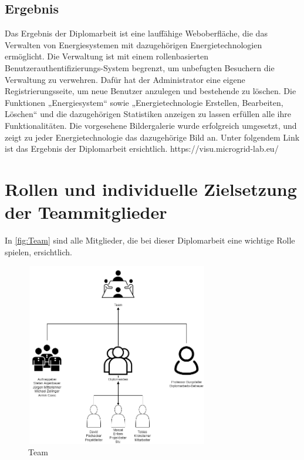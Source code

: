\subsection{Ergebnis}
Das Ergebnis der Diplomarbeit ist eine lauffähige Weboberfläche, die das Verwalten von Energiesystemen mit dazugehörigen Energietechnologien ermöglicht. Die Verwaltung ist mit einem rollenbasierten Benutzerauthentifizierungs-System begrenzt, um unbefugten Besuchern die Verwaltung zu verwehren. Dafür hat der Administrator eine eigene Registrierungsseite, um neue Benutzer anzulegen und bestehende zu löschen. Die Funktionen „Energiesystem“ sowie „Energietechnologie Erstellen, Bearbeiten, Löschen“ und die dazugehörigen Statistiken anzeigen zu lassen erfüllen alle ihre Funktionalitäten. Die vorgesehene Bildergalerie wurde erfolgreich umgesetzt, und zeigt zu jeder Energietechnologie das dazugehörige Bild an.
Unter folgendem Link ist das Ergebnis der Diplomarbeit ersichtlich.
https://visu.microgrid-lab.eu/


\newpage
\section{Rollen und individuelle Zielsetzung der Teammitglieder}
In \autoref{fig:Team} sind alle Mitglieder, die bei dieser Diplomarbeit eine wichtige Rolle spielen, ersichtlich.

\begin{figure}[h]
	\centering
	\includegraphics[height=8cm,width=8cm]{images/Team}
	\caption{Team}
	\label{fig:Team}
\end{figure}



